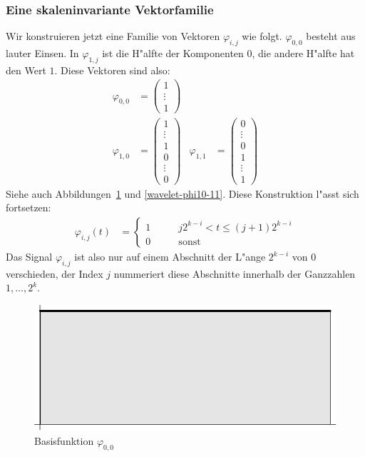 \subsubsection{Eine skaleninvariante Vektorfamilie}
Wir konstruieren jetzt eine Familie von Vektoren $\varphi_{i,j}$
wie folgt. $\varphi_{0,0}$ besteht aus lauter Einsen. In $\varphi_{1,j}$
ist die H"alfte der Komponenten $0$, die andere H"alfte hat den
Wert $1$. 
Diese Vektoren sind also:
\begin{align*}
\varphi_{0,0}&=\begin{pmatrix}1\\\vdots\\1\end{pmatrix}
\\
\varphi_{1,0}&=\begin{pmatrix}1\\\vdots\\1\\0\\\vdots\\0\end{pmatrix}&
\varphi_{1,1}&=\begin{pmatrix}0\\\vdots\\0\\1\\\vdots\\1\end{pmatrix}
\end{align*}
Siehe auch Abbildungen~\ref{wavelet-phi00} und \ref{wavelet-phi10-11}.
Diese Konstruktion l"asst sich fortsetzen:
\begin{align*}
\varphi_{i,j}(t)&=\begin{cases}
1&\qquad j2^{k-i}<t\le (j+1)2^{k-i}\\
0&\qquad\text{sonst}
\end{cases}
\end{align*}
Das Signal $\varphi_{i,j}$ ist also nur auf einem Abschnitt der
L"ange $2^{k-i}$ von $0$ verschieden, der Index $j$ nummeriert
diese Abschnitte innerhalb der Ganzzahlen $1,\dots,2^k$.
\begin{figure}
\begin{center}
\includegraphics[width=0.45\hsize]{images/w-1}
\end{center}
\caption{Basisfunktion $\varphi_{0,0}$\label{wavelet-phi00}}
\end{figure}
